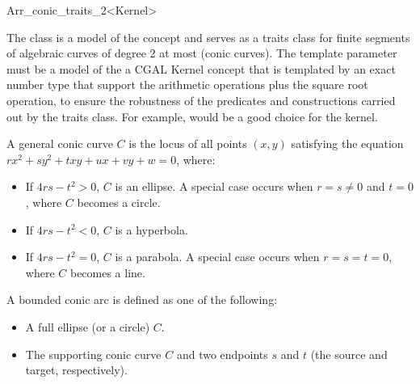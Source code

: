 
\ccRefPageBegin

\begin{ccRefClass}{Arr_conic_traits_2<Kernel>}

\ccDefinition
    The class  is a model of the 
     concept and serves as a traits class for finite
    segments of algebraic curves of degree 2 at most (conic curves).
    The template parameter  must be a model of the a CGAL Kernel 
    concept that is templated by an exact number type that support the 
    arithmetic operations plus the square root operation, to ensure the
    robustness of the predicates and constructions carried out by the traits
    class. For example,  would be a good choice
    for the kernel.

    A general conic curve $C$ is the locus of all points $(x,y)$ satisfying the
    equation $rx^2 + sy^2 + txy + ux + vy + w = 0$, where:
    \begin{itemize}
    \item If $4rs - t^2 > 0$, $C$ is an ellipse. A special case occurs when
          $r = s \neq 0$ and $t = 0$, where $C$ becomes a circle.
    \item If $4rs - t^2 < 0$, $C$ is a hyperbola.
    \item If $4rs - t^2 = 0$, $C$ is a parabola. A special case occurs when
          $r = s = t = 0$, where $C$ becomes a line. 
    \end{itemize}

    A bounded conic arc is defined as one of the following:
    \begin{itemize}
    \item A full ellipse (or a circle) $C$.
    \item The supporting conic curve $C$ and two endpoints $s$ and $t$ (the 
    source and target, respectively).
    \end{itemize}


\end{ccRefClass}
